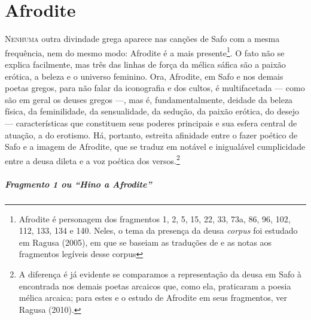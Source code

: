 \pagestyle{plain}



\chapter{Afrodite}

\textsc{Nenhuma} outra divindade grega aparece nas canções de Safo com a mesma
frequência, nem do mesmo modo: Afrodite é a mais presente\footnote{ Afrodite é
personagem dos fragmentos 1, 2, 5, 15, 22, 33, 73a, 86, 96, 102, 112, 133, 134
e 140. Neles, o tema da presença da deusa \textit{corpus} foi estudado em Ragusa (2005), em que se baseiam as traduções de e as notas aos fragmentos legíveis desse corpus}. O fato
não se explica facilmente, mas três das linhas de força da mélica sáfica são a
paixão erótica, a beleza e o universo feminino. Ora, Afrodite, em Safo e nos
demais poetas gregos, para não falar da iconografia e dos cultos, é
multifacetada --- como são em geral os deuses gregos ---, mas é, fundamentalmente,
deidade da beleza física, da feminilidade, da sensualidade, da sedução, da
paixão erótica, do desejo --- características que constituem seus poderes
principais e sua esfera central de atuação, a do erotismo. Há, portanto,
estreita afinidade entre o fazer poético de Safo e a imagem de Afrodite, que se
traduz em notável e inigualável cumplicidade entre a deusa dileta e a voz
poética dos versos.\footnote{ A diferença é já evidente se comparamos a
representação da deusa em Safo à encontrada nos demais poetas arcaicos que, como ela, praticaram a poesia mélica arcaica; para estes e o estudo de Afrodite em seus fragmentos, ver Ragusa (2010).}

\paragraph{Fragmento 1 ou “Hino a Afrodite”}

